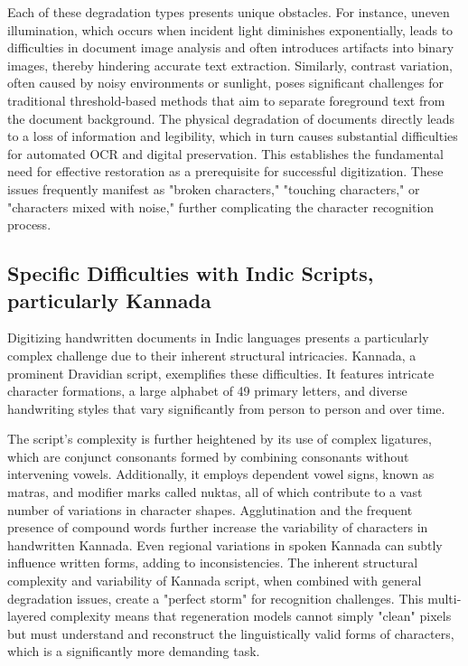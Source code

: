 \documentclass[conference]{IEEEtran}
\begin{document}
Each of these degradation types presents unique obstacles. For instance, uneven illumination, which occurs when incident light diminishes exponentially, leads to difficulties in document image analysis and often introduces artifacts into binary images, thereby hindering accurate text extraction.\cite{Davis2020} Similarly, contrast variation, often caused by noisy environments or sunlight, poses significant challenges for traditional threshold-based methods that aim to separate foreground text from the document background.\cite{Davis2020} The physical degradation of documents directly leads to a loss of information and legibility, which in turn causes substantial difficulties for automated OCR and digital preservation. This establishes the fundamental need for effective restoration as a prerequisite for successful digitization. These issues frequently manifest as "broken characters," "touching characters," or "characters mixed with noise," further complicating the character recognition process.

\subsection{Specific Difficulties with Indic Scripts, particularly Kannada}
\justify
Digitizing handwritten documents in Indic languages presents a particularly complex challenge due to their inherent structural intricacies. Kannada, a prominent Dravidian script, exemplifies these difficulties. It features intricate character formations, a large alphabet of 49 primary letters, and diverse handwriting styles that vary significantly from person to person and over time.\cite{Bhunia2023}

The script's complexity is further heightened by its use of complex ligatures, which are conjunct consonants formed by combining consonants without intervening vowels. Additionally, it employs dependent vowel signs, known as matras, and modifier marks called nuktas, all of which contribute to a vast number of variations in character shapes. Agglutination and the frequent presence of compound words further increase the variability of characters in handwritten Kannada.\cite{Ahmed2024} Even regional variations in spoken Kannada can subtly influence written forms, adding to inconsistencies. The inherent structural complexity and variability of Kannada script, when combined with general degradation issues, create a "perfect storm" for recognition challenges. This multi-layered complexity means that regeneration models cannot simply "clean" pixels but must understand and reconstruct the linguistically valid forms of characters, which is a significantly more demanding task.
\end{document}
